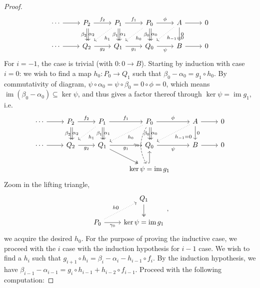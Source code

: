 \documentclass[10pt]{report}
\theoremstyle{definition}
\begin{document}
\begin{proof}
$$
\begin{tikzcd}
\cdots \arrow[r] & P_2 \arrow[r, "f_2"] \arrow[d, "\alpha_2"] \arrow[d, shift left, "\beta_2"'] & P_1 \arrow[r, "f_1"] \arrow[d, "\alpha_1"] \arrow[d, shift left, "\beta_1"'] \arrow[dl, dotted, "h_1"] & P_0 \arrow[r, "\phi"] \arrow[d, "\alpha_0"] \arrow[d, shift left, "\beta_0"'] \arrow[dl, dotted, "h_0"] & A \arrow[r] \arrow[d, "0"] \arrow[dl, dotted, "h_{-1}=0"] & 0 \\
\cdots \arrow[r] & Q_2 \arrow[r, "g_2"'] & Q_1 \arrow[r, "g_1"']                      & Q_0 \arrow[r, "\psi"']                      & B \arrow[r]                     & 0
\end{tikzcd}
$$
For $i=-1$, the case is trivial (with $0:0\to B$). Starting by induction with case $i=0$: we wish to find a map $h_0:P_0\to Q_1$ such that $\beta_0-\alpha_0=g_1\circ h_0$. By commutativity of diagram, $\psi\circ\alpha_0=\psi\circ\beta_0=0\circ\phi=0$, which means $\operatorname{im}(\beta_0-\alpha_0)\subseteq\ker\psi$, and thus gives a factor thereof through $\ker\psi=\operatorname{im}g_1$, i.e.
$$
\begin{tikzcd}
\cdots \arrow[r] & P_2 \arrow[r, "f_2"] \arrow[d, "\alpha_2"] \arrow[d, shift left, "\beta_2"'] & P_1 \arrow[r, "f_1"] \arrow[d, "\alpha_1"] \arrow[d, shift left, "\beta_1"'] \arrow[dl, dotted, "h_1"] & P_0 \arrow[dd, bend right, dashed, "\gamma_0"'] \arrow[r, "\phi"] \arrow[d, "\alpha_0"] \arrow[d, shift left, "\beta_0"'] \arrow[dl, dotted, "h_0"] & A \arrow[r] \arrow[d, "0"] \arrow[dl, dotted, "h_{-1}=0"] & 0 \\
\cdots \arrow[r] & Q_2 \arrow[r, "g_2"'] & Q_1 \arrow[rd, two heads] \arrow[r, "g_1"']                      & Q_0 \arrow[r, "\psi"']                      & B \arrow[r]                     & 0\\
{} & {} & {} & \ker\psi=\operatorname{im}g_1 \arrow[u, hook] & {} & {}
\end{tikzcd}
$$
Zoom in the lifting triangle,
$$
\begin{tikzcd}
                                                    & Q_1 \arrow[d, two heads]      \\
P_0 \arrow[r, "\gamma_0"'] \arrow[ru, "h0", dotted] & \ker\psi=\operatorname{im}g_1
\end{tikzcd},
$$
we acquire the desired $h_0$.
For the purpose of proving the inductive case, we proceed with the $i$ case with the induction hypothesis for $i-1$ case. We wish to find a $h_i$ such that $g_{i+1}\circ h_i=\beta_i-\alpha_i-h_{i-1}\circ f_i$. By the induction hypothesis, we have $\beta_{i-1}-\alpha_{i-1}=g_{i}\circ h_{i-1}+h_{i-2}\circ f_{i-1}$. Proceed with the following computation:

\end{proof}
\end{document}

